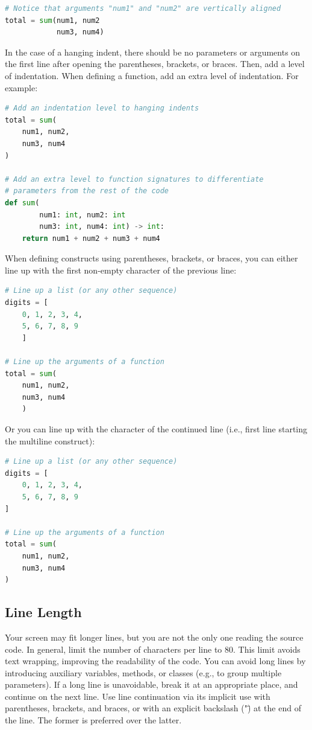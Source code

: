 \documentclass{tufte-handout}
\begin{document}
\begin{lstlisting}[numbers=none,language=python]
# Notice that arguments "num1" and "num2" are vertically aligned
total = sum(num1, num2
            num3, num4)
\end{lstlisting}

In the case of a hanging indent, there should be no parameters or arguments on the first line after opening the parentheses, brackets, or braces.
Then, add a level of indentation.
When defining a function, add an extra level of indentation.
For example:

\begin{lstlisting}[numbers=none,language=python]
# Add an indentation level to hanging indents
total = sum(
    num1, num2,
    num3, num4
)

# Add an extra level to function signatures to differentiate 
# parameters from the rest of the code
def sum(
        num1: int, num2: int
        num3: int, num4: int) -> int:
    return num1 + num2 + num3 + num4
\end{lstlisting}

When defining constructs using parentheses, brackets, or braces, you can either line up with the first non-empty character of the previous line:

\begin{lstlisting}[numbers=none,language=python]
# Line up a list (or any other sequence)
digits = [
    0, 1, 2, 3, 4,
    5, 6, 7, 8, 9 
    ]
    
# Line up the arguments of a function
total = sum(
    num1, num2,
    num3, num4
    )
\end{lstlisting}

Or you can line up with the character of the continued line (i.e., first line starting the multiline construct):

\begin{lstlisting}[numbers=none,language=python]
# Line up a list (or any other sequence)
digits = [
	0, 1, 2, 3, 4,
	5, 6, 7, 8, 9 
]
	
# Line up the arguments of a function
total = sum(
	num1, num2,
	num3, num4
)
\end{lstlisting}

\subsection{Line Length}
Your screen may fit longer lines, but you are not the only one reading the source code.
In general, limit the number of characters per line to 80.
This limit avoids text wrapping, improving the readability of the code.
You can avoid long lines by introducing auxiliary variables, methods, or classes (e.g., to group multiple parameters).
If a long line is unavoidable, break it at an appropriate place, and continue on the next line.
Use line continuation via its implicit use with parentheses, brackets, and braces, or with an explicit backslash ("\") at the end of the line.
The former is preferred over the latter.
\end{document}
